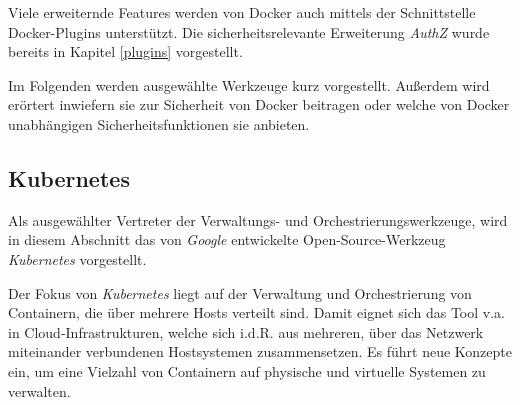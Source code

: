 \documentclass[../main.tex]{subfiles}
\begin{document}
    Viele erweiternde Features werden von Docker auch mittels der Schnittstelle Docker-Plugins unterstützt. Die sicherheitsrelevante Erweiterung \emph{AuthZ} wurde bereits in Kapitel \ref{plugins} vorgestellt.

    Im Folgenden werden ausgewählte Werkzeuge kurz vorgestellt. Außerdem wird erörtert inwiefern sie zur Sicherheit von Docker beitragen oder welche von Docker unabhängigen Sicherheitsfunktionen sie anbieten.



    \subsection{Kubernetes}
      Als ausgewählter Vertreter der Verwaltungs- und Orchestrierungswerkzeuge, wird in diesem Abschnitt das von \emph{Google} entwickelte Open-Source-Werkzeug \emph{Kubernetes} vorgestellt.

      Der Fokus von \emph{Kubernetes} liegt auf der Verwaltung und Orchestrierung von Containern, die über mehrere Hosts verteilt sind. Damit eignet sich das Tool v.a. in Cloud-Infrastrukturen, welche sich i.d.R. aus mehreren, über das Netzwerk miteinander verbundenen Hostsystemen zusammensetzen. Es führt neue Konzepte ein, um eine Vielzahl von Containern auf physische und virtuelle Systemen zu verwalten.

\end{document}
